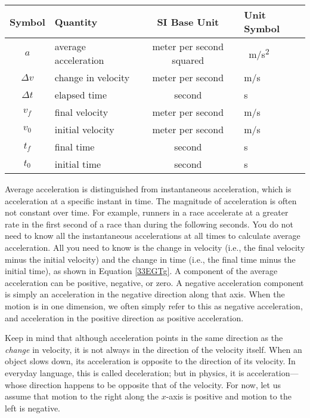 \documentclass[dvipsnames]{article}
\begin{document}
\begin{center}
    \begin{tabular}{cl|cl}
    \hline
    \textbf{Symbol} & \textbf{Quantity} & \textbf{SI Base Unit} & \textbf{Unit Symbol}  \\
    \hline\hline
    \rule{0pt}{2.5ex}
        $a$ & average acceleration & meter per second squared & \SI{}{\meter/\second^2}\\
        $\Delta{v}$ & change in velocity & meter per second & m/s\\
        $\Delta{t}$ & elapsed time & second & s \\
    \hline
        $v_f$ & final velocity & meter per second & m/s\\
        $v_0$ & initial velocity & meter per second & m/s\\
        $t_f$ & final time & second & s \\    
        $t_0$ & initial time & second & s \\
        \hline
    \end{tabular}
    \captionsetup{type=figure,margin=1in,font=scriptsize}
\end{center}

Average acceleration is distinguished from instantaneous acceleration, which is acceleration at a specific instant in time. The magnitude of acceleration is often not constant over time. For example, runners in a race accelerate at a greater rate in the first second of a race than during the following seconds. You do not need to know all the instantaneous accelerations at all times to calculate average acceleration. All you need to know is the change in velocity (i.e., the final velocity minus the initial velocity) and the change in time (i.e., the final time minus the initial time), as shown in Equation \eqref{33EGTg}. A component of the average acceleration can be positive, negative, or zero. A negative acceleration component is simply an acceleration in the negative direction along that axis. When the motion is in one dimension, we often simply refer to this as negative acceleration, and acceleration in the positive direction as positive acceleration.

\vspace{1em}

Keep in mind that although acceleration points in the same direction as the \textit{change} in velocity, it is not always in the direction of the velocity itself. When an object slows down, its acceleration is opposite to the direction of its velocity. In everyday language, this is called deceleration; but in physics, it is acceleration---whose direction happens to be opposite that of the velocity. For now, let us assume that motion to the right along the $x$-axis is positive and motion to the left is negative.
\end{document}

